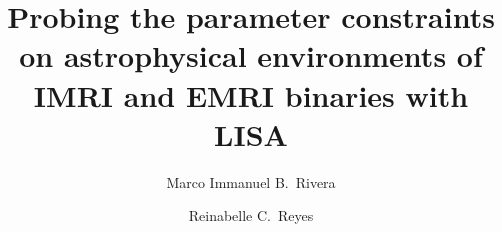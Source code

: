 \documentclass[10pt,a4paper,twoside]{article}
\begin{document}
\title{\TitleFont Probing the parameter constraints on astrophysical environments of IMRI and EMRI binaries with LISA}


\author[*\negthickspace]{Marco Immanuel B.~Rivera}
\author[ ]{Reinabelle C.~Reyes
\lastauthorsep}



\end{document}
